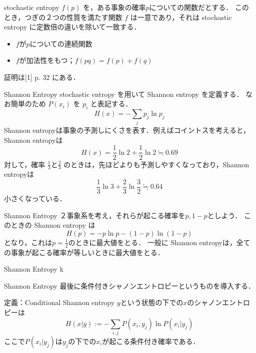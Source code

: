 \documentclass[aspectratio=169, dvipdfmx, 11pt,uplatex]{beamer} %
\begin{document}
\begin{frame}{stochastic entropy}
  $f(p)$ を，ある事象の確率$p$についての関数だとする．
  このとき，つぎの２つの性質を満たす関数 $f$ は一意であり，それは stochastic entropy に定数倍の違いを除いて一致する．
  \begin{itemize}
    \item $f$が$p$についての連続関数
    \item $f$が加法性をもつ；$f(pq) = f(p) + f(q)$
  \end{itemize}
  証明は[1] p. 32 にある．
\end{frame}

\begin{frame}{Shannon Entropy}
  stochastic entropy を用いて Shannon entropy を定義する．
  なお簡単のため $P(x_i)$ を $p_i$ と表記する．
  \begin{equation}
    H(x) = - \sum_j p_j \ln p_j 
  \end{equation}
  Shannon entropyは事象の予測しにくさを表す．例えばコイントスを考えると，Shannon entropyは 
  \begin{equation}
    H(x) = \frac{1}{2} \ln 2 + \frac{1}{2} \ln 2 \fallingdotseq 0.69
  \end{equation}
  対して，確率 $\frac{1}{3}$と$\frac{2}{3}$ のときは，先ほどよりも予測しやすくなっており，Shannon entropyは 
  \begin{equation}
    \frac{1}{3} \ln 3 + \frac{2}{3} \ln \frac{3}{2} \fallingdotseq 0.64
  \end{equation}
  小さくなっている．
\end{frame}

\begin{frame}{Shannon Entropy}
  ２事象系を考え，それらが起こる確率を$p, 1-p$としよう．
  このときの Shannon entropy は 
  \begin{equation}
    H(p) = -p \ln p - (1-p) \ln (1-p) 
  \end{equation}
  となり，これは$p=\frac{1}{2}$のときに最大値をとる．
  一般に Shannon entropyは，全ての事象が起こる確率が等しいときに最大値をとる．
\end{frame}

\begin{frame}{Shannon Entropy}
  k
\end{frame}

\begin{frame}{Shannon Entropy}
  最後に条件付きシャノンエントロピーというものを導入する．
  \begin{block}{定義：Conditional Shannon entropy}
    $y$という状態の下での$x$のシャノンエントロピーは
    \begin{equation}
      H(x|y) := - \sum_{i, j} P(x_i, y_j) \ln P(x_i|y_j)
    \end{equation}
    ここで$P(x_i|y_j)$は$y_j$の下での$x_i$が起こる条件付き確率である．
  \end{block}
\end{frame}
\end{document}
